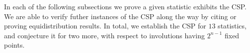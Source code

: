 \documentclass{amsart}
\theoremstyle{definition}
\newcommand{\arrowpattern}{\underset{\mathsmaller{1\shortrightarrow 2}}{\underline{12}}}
\begin{document}
In each of the following subsections we prove a given statistic exhibits the CSP.  We are able to verify futher instances of the CSP along the way by citing or proving equidistribution results.  In total, we establish the CSP for $13$ statistics, and conjecture it for two more, with respect to involutions having $2^{n-1}$ fixed points. 


\end{document}
